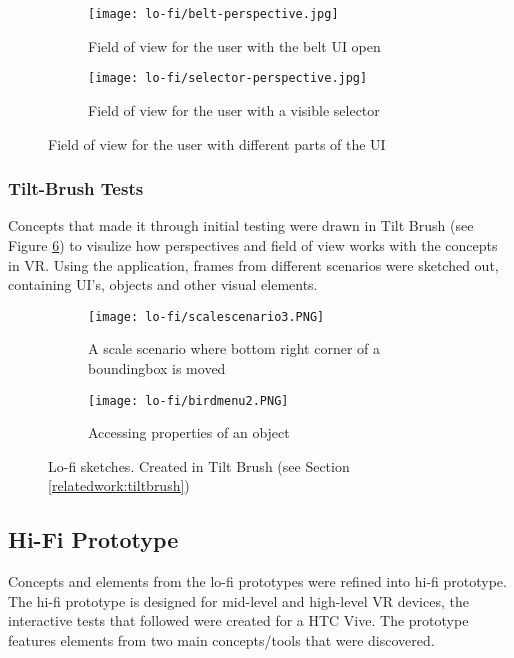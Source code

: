 
\begin{figure}
  \begin{subfigure}{.5\textwidth}
  \centering
  \texttt{[image: lo-fi/belt-perspective.jpg]}
  \caption{Field of view for the user with the belt UI open}
  \label{fig:lofi:fov:belt-ui}
  \end{subfigure}%
  \begin{subfigure}{.5\textwidth}
    \centering
    \texttt{[image: lo-fi/selector-perspective.jpg]}
    \caption{Field of view for the user with a visible selector}
    \label{fig:lofi:fov:selector}
\end{subfigure}
\caption{Field of view for the user with different parts of the UI}
\label{fig:lofi:fov}
\end{figure}


\subsubsection{Tilt-Brush Tests}
Concepts that made it through initial testing were drawn in Tilt Brush (see Figure \ref{fig:lofi:tilt})  to visulize how perspectives and field of view works with the concepts in VR. Using the application, frames from different scenarios were sketched out, containing UI's, objects and other visual elements.


\begin{figure}
\begin{subfigure}{.5\textwidth}
  \centering
  \texttt{[image: lo-fi/scalescenario3.PNG]}
  \caption{A scale scenario where bottom right corner of a boundingbox is moved}
  \label{fig:lofi:tilt:scale3}
\end{subfigure}%
\begin{subfigure}{.5\textwidth}
  \centering
  \texttt{[image: lo-fi/birdmenu2.PNG]}
  \caption{Accessing properties of an object}
  \label{fig:lofi:tilt:passivemenu}
\end{subfigure}
\caption{Lo-fi sketches. Created in Tilt Brush (see Section \ref{relatedwork:tiltbrush})}
\label{fig:lofi:tilt}
\end{figure}

\subsection{Hi-Fi Prototype}
Concepts and elements from the lo-fi prototypes were refined into hi-fi prototype. The hi-fi prototype is designed for mid-level and high-level VR devices, the interactive tests that followed were created for a HTC Vive. The prototype features elements from two main concepts/tools that were discovered.

